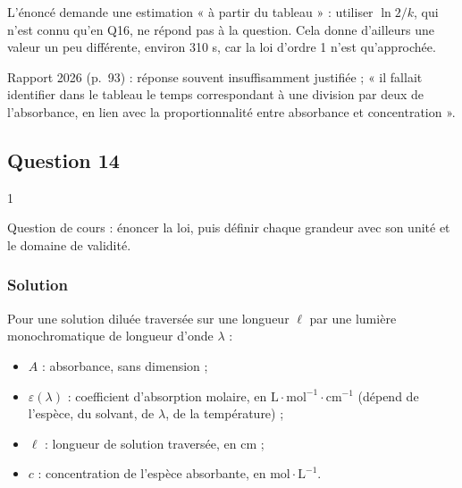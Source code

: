\documentclass[11pt,a4paper]{article}
\providecommand{\tightlist}{\setlength{\itemsep}{0pt}\setlength{\parskip}{0pt}}
\newcommand{\equationajustee}[1]{%
  \sbox{\boiteequation}{$\displaystyle #1$}%
  \ifdim\wd\boiteequation>\linewidth
    \[\resizebox{\linewidth}{!}{\usebox{\boiteequation}}\]%
  \else
    \[#1\]%
  \fi}
\begin{document}
\equationajustee{\boxed{t_{1/2}\approx2{,}7\cdot10^2\ \mathrm s}}

\begin{piege}

L'énoncé demande une estimation « à partir du tableau » : utiliser \(\ln2/k\), qui n'est connu qu'en Q16, ne répond pas à la question. Cela donne d'ailleurs une valeur un peu différente, environ 310 s, car la loi d'ordre 1 n'est qu'approchée.

\end{piege}

\begin{jury}

Rapport 2026 (p.~93) : réponse souvent insuffisamment justifiée ; « il fallait identifier dans le tableau le temps correspondant à une division par deux de l'absorbance, en lien avec la proportionnalité entre absorbance et concentration ».

\end{jury}

\hypertarget{question-14}{%
\subsection{Question 14}\label{question-14}}

\begin{indication}{1}

Question de cours : énoncer la loi, puis définir chaque grandeur avec son unité et le domaine de validité.

\end{indication}

\hypertarget{solution-13}{%
\subsubsection{Solution}\label{solution-13}}

Pour une solution diluée traversée sur une longueur \(\ell\) par une lumière monochromatique de longueur d'onde \(\lambda\) :

\equationajustee{A=\log\frac{I_0}{I}=\varepsilon(\lambda)\,\ell\,c}

\begin{itemize}
\tightlist
\item
  \(A\) : absorbance, sans dimension ;
\item
  \(\varepsilon(\lambda)\) : coefficient d'absorption molaire, en \(\mathrm{L\cdot mol^{-1}\cdot cm^{-1}}\) (dépend de l'espèce, du solvant, de \(\lambda\), de la température) ;
\item
  \(\ell\) : longueur de solution traversée, en cm ;
\item
  \(c\) : concentration de l'espèce absorbante, en \(\mathrm{mol\cdot L^{-1}}\).
\end{itemize}
\end{document}
